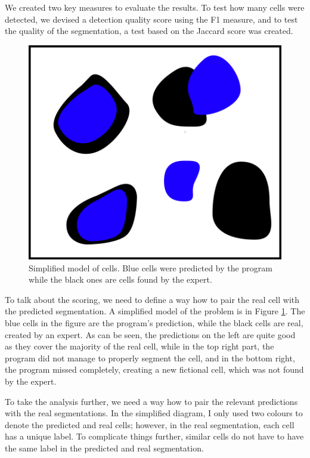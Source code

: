 \documentclass[
  digital,     %
  oneside,     %
  nosansbold,  %
  nocolorbold, %
  lof,         %
  lot,         %
]{fithesis4}
\begin{document}
We created two key measures to evaluate the results. To test how many cells were
detected, we devised a detection quality score using the F1 measure, and to test the
quality of the segmentation, a test based on the Jaccard score was created.
\begin{figure}
    \begin{center}
        \includegraphics{resources/inkscape/evaluation.png}
    \end{center}
    \caption{Simplified model of cells. Blue cells were predicted by the program
    while the black ones are cells found by the expert.}
    \label{fig:evaluation_basic}
\end{figure}
To talk about the scoring, we need to define a way how to pair the real cell
with the predicted segmentation. A simplified model of the problem is in Figure
\ref{fig:evaluation_basic}. The blue cells in the figure are the program's
prediction, while the black cells are real, created by an expert. As can be seen,
the predictions on the left are quite good as they cover the majority of the real
cell, while in the top right part, the program did not manage to properly
segment the cell, and in the bottom right, the program missed completely,
creating a new fictional cell, which was not found by the expert.

To take the analysis further, we need a way how to pair the relevant predictions
with the real segmentations. In the simplified diagram, I only used two colours
to denote the predicted and real cells; however, in the real segmentation, each
cell has a unique label. To complicate things further, similar cells do not
have to have the same label in the predicted and real segmentation.
\end{document}

